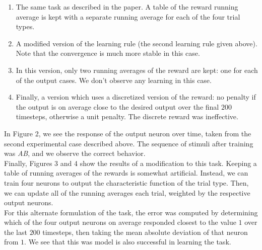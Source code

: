 \documentclass{article}
\theoremstyle{plain}
\theoremstyle{definition}
\theoremstyle{remark}
\begin{document}
\begin{enumerate}
    \item The same task as described in the paper. A table of the reward running average is kept with a separate running average for each of the four trial types. \\

    \item A modified version of the learning rule (the second learning rule given above). Note that the convergence is much more stable in this case. \\

    \item In this version, only two running averages of the reward are kept: one for each of the output cases. We don't observe any learning in this case. \\

    \item Finally, a version which uses a discretized version of the reward: no penalty if the output is on average close to the desired output over the final $200$ timesteps, otherwise a unit penalty. The discrete reward was ineffective. \\
\end{enumerate}

In Figure 2, we see the response of the output neuron over time, taken from the second experimental case described above. The sequence of stimuli after training was \textit{AB}, and we observe the correct behavior. \\

Finally, Figures 3 and 4 show the results of a modification to this task. Keeping a table of running averages of the rewards is somewhat artificial. Instead, we can train four neurons to output the characteristic function of the trial type. Then, we can update all of the running averages each trial, weighted by the respective output neurons. \\

For this alternate formulation of the task, the error was computed by determining which of the four output neurons on average responded closest to the value $1$ over the last $200$ timesteps, then taking the mean absolute deviation of that neuron from $1$. We see that this was model is also successful in learning the task. \\
\end{document}
